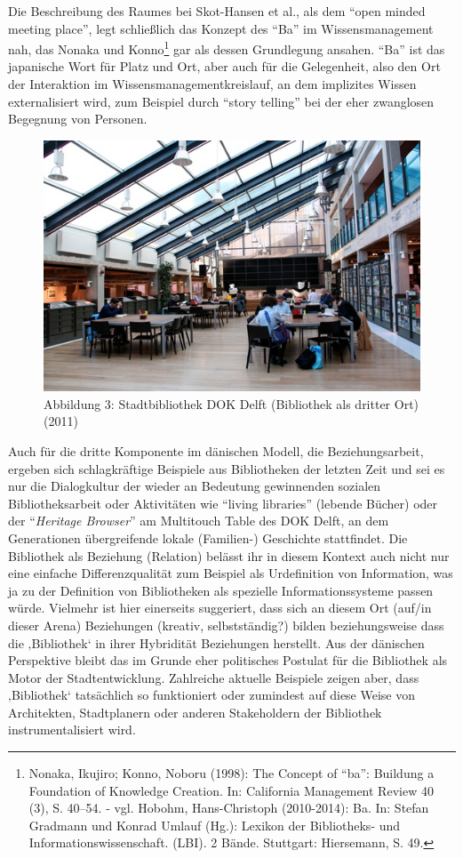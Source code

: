 Die Beschreibung des Raumes bei Skot-Hansen et al., als dem
\enquote{open minded meeting place}, legt schließlich das Konzept des
\enquote{Ba} im Wissensmanagement nah, das Nonaka und Konno\footnote{Nonaka,
  Ikujiro; Konno, Noboru (1998): The Concept of \enquote{ba}: Buildung a
  Foundation of Knowledge Creation. In: California Management Review 40
  (3), S. 40--54. - vgl. Hobohm, Hans-Christoph (2010-2014): Ba. In:
  Stefan Gradmann und Konrad Umlauf (Hg.): Lexikon der Bibliotheks- und
  Informationswissenschaft. (LBI). 2 Bände. Stuttgart: Hiersemann, S.
  49.} gar als dessen Grundlegung ansahen. \enquote{Ba} ist das
japanische Wort für Platz und Ort, aber auch für die Gelegenheit, also
den Ort der Interaktion im Wissensmanagementkreislauf, an dem implizites
Wissen externalisiert wird, zum Beispiel durch \enquote{story telling}
bei der eher zwanglosen Begegnung von Personen.

\begin{figure}[htbp]
\centering
\includegraphics{img/hobohm-3.jpg}
\caption{Abbildung 3: Stadtbibliothek DOK Delft (Bibliothek als dritter
Ort)(2011)}
\end{figure}

Auch für die dritte Komponente im dänischen Modell, die
Beziehungsarbeit, ergeben sich schlagkräftige Beispiele aus Bibliotheken
der letzten Zeit und sei es nur die Dialogkultur der wieder an Bedeutung
gewinnenden sozialen Bibliotheksarbeit oder Aktivitäten wie
\enquote{living libraries} (lebende Bücher) oder der
\enquote{\emph{Heritage Browser}} am Multitouch Table des DOK Delft, an
dem Generationen übergreifende lokale (Familien-) Geschichte
stattfindet. Die Bibliothek als Beziehung (Relation) belässt ihr in
diesem Kontext auch nicht nur eine einfache Differenzqualität zum
Beispiel als Urdefinition von Information, was ja zu der Definition von
Bibliotheken als spezielle Informationssysteme passen würde. Vielmehr
ist hier einerseits suggeriert, dass sich an diesem Ort (auf/in dieser
Arena) Beziehungen (kreativ, selbstständig?) bilden beziehungsweise dass
die ‚Bibliothek` in ihrer Hybridität Beziehungen herstellt. Aus der
dänischen Perspektive bleibt das im Grunde eher politisches Postulat für
die Bibliothek als Motor der Stadtentwicklung. Zahlreiche aktuelle
Beispiele zeigen aber, dass ‚Bibliothek` tatsächlich so funktioniert
oder zumindest auf diese Weise von Architekten, Stadtplanern oder
anderen Stakeholdern der Bibliothek instrumentalisiert wird.

